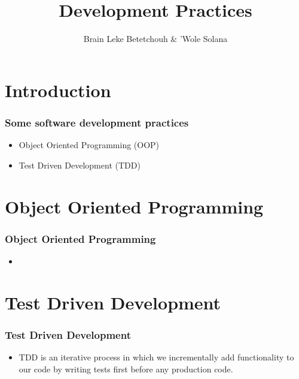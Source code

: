 \documentclass[10pt,t,xcolor=dvipsnames]{beamer}
\title{ Development Practices }
\author{ Brain Leke Betetchouh \& 'Wole Solana }
\begin{document}
\frame [c, plain]{\titlepage}
\section{Introduction}
\begin{frame}
\frametitle{Some software development practices}
\begin{itemize}[<+->]
\item Object Oriented Programming (OOP)
\item Test Driven Development (TDD)
\end{itemize}
\end{frame}
\section{Object Oriented Programming}
\begin{frame}[fragile]
\frametitle{Object Oriented Programming}
\begin{itemize}[<+->]
\item
\end{itemize}
\end{frame}
\section{Test Driven Development}
\begin{frame}[fragile]
\frametitle{Test Driven Development}
\begin{itemize}
\item TDD is an \alert{iterative} process in which we \alert{incrementally} add functionality to our code by \alert{writing tests first} before any production code.
\end{itemize}
\end{frame}
\end{document}
